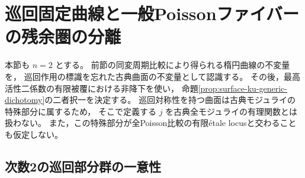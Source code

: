 \section{巡回固定曲線と一般Poissonファイバーの残余圏の分離}
\label{sec:kuznetsov-cyclic-fibres}

本節も $n=2$ とする。
前節の同変周期比較により得られる楕円曲線の不変量を，
巡回作用の標識を忘れた古典曲面の不変量として認識する。
その後，最高活性二係数の有限被覆における非降下を使い，
命題\ref{prop:surface-ku-generic-dichotomy}の二者択一を決定する。
巡回対称性を持つ曲面は古典モジュライの特殊部分に属するため，
そこで定義する $j$ を古典全モジュライの有理関数とは扱わない。
また，この特殊部分が全Poisson比較の有限\'{e}tale locusと交わることも仮定しない。

\subsection{次数2の巡回部分群の一意性}

